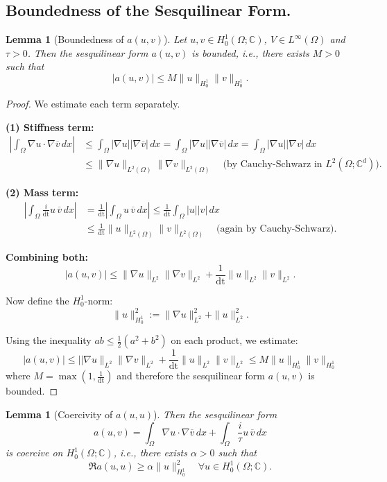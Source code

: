 \documentclass{article}
\theoremstyle{definition}
\theoremstyle{plain}
\newtheorem{lemma}[definition]{Lemma}
\theoremstyle{remark}
\begin{document}
\subsection{Boundedness of the Sesquilinear Form.}
\begin{lemma}[Boundedness of $a(u, v)$]
Let $u, v \in H_0^1(\Omega; \mathbb{C})$, $V \in L^\infty(\Omega)$ and $\tau > 0$. Then the sesquilinear form $a(u, v)$ is bounded, i.e., there exists $M > 0$ such that
\[
|a(u, v)| \leq M \|u\|_{H_0^1} \|v\|_{H_0^1}.
\]
\end{lemma}

\begin{proof}
We estimate each term separately.

\textbf{(1) Stiffness term:}
\begin{align*}
  \left| \int_\Omega \nabla u \cdot \nabla \overline{v} \, dx \right| &\leq \int_\Omega |\nabla u| |\nabla \overline{v}| \, dx = \int_\Omega |\nabla u| |\nabla \overline{v}| \, dx = \int_\Omega |\nabla u| |\nabla v| \, dx \\
  & \leq \|\nabla u\|_{L^2(\Omega)} \|\nabla v\|_{L^2(\Omega)}
\quad \text{(by Cauchy-Schwarz in } L^2(\Omega; \mathbb{C}^d) \text{)}.
\end{align*}


\textbf{(2) Mass term:}
\begin{align*}
\left| \int_\Omega \frac{i}{\text{dt}} u \, \overline{v} \, dx \right|
&= \frac{1}{\text{dt}} \left| \int_\Omega u \, \overline{v} \, dx \right| \leq \frac{1}{\text{dt}} \int_\Omega |u| |v| \, dx \\
& \leq \frac{1}{\text{dt}} \|u\|_{L^2(\Omega)} \|v\|_{L^2(\Omega)} \quad \text{(again by Cauchy-Schwarz)}.
\end{align*}

\textbf{Combining both:}
\[
|a(u, v)| \leq \|\nabla u\|_{L^2} \|\nabla v\|_{L^2}
+ \frac{1}{\text{dt}} \|u\|_{L^2} \|v\|_{L^2}.
\]

Now define the $H_0^1$-norm:
\[
\|u\|_{H_0^1}^2 := \|\nabla u\|_{L^2}^2 + \|u\|_{L^2}^2.
\]

Using the inequality $ab \leq \tfrac{1}{2}(a^2 + b^2)$ on each product, we estimate:
\[
|a(u, v)| \leq ||\nabla u\|_{L^2} \|\nabla v\|_{L^2} + \frac{1}{\text{dt}} \|u\|_{L^2} \|v\|_{L^2} \leq M \|u\|_{H_0^1} \|v\|_{H_0^1}
\]
where \( M = \max(1, \frac{1}{\text{dt}}) \) and therefore the sesquilinear form \( a(u, v) \) is bounded.
\end{proof}


\begin{lemma}[Coercivity of $a(u, u)$]
Then the sesquilinear form
\[
a(u, v) = \int_\Omega \nabla u \cdot \nabla \overline{v} \, dx + \int_\Omega  \frac{i}{\tau}  u \, \overline{v} \, dx
\]
is coercive on $H_0^1(\Omega; \mathbb{C})$, i.e., there exists $\alpha > 0$ such that
\[
\Re a(u, u) \geq \alpha \|u\|_{H_0^1}^2 \quad \forall u \in H_0^1(\Omega; \mathbb{C}).
\]
\end{lemma}
\end{document}
